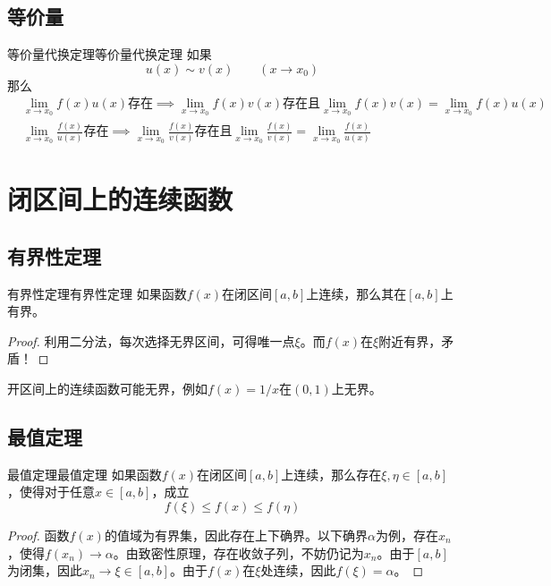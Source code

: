 \documentclass[lang = cn, scheme = chinese, thmcnt = section]{elegantbook}
\begin{document}
\subsection{等价量}

\begin{theorem}{等价量代换定理}{等价量代换定理}
	如果
	$$
	u(x)\sim v(x)\qquad (x\to x_0)
	$$
	那么
	\begin{align*}
		& \lim_{x\to x_0}f(x)u(x)\text{存在}\implies\lim_{x\to x_0}f(x)v(x)\text{存在且}\lim_{x\to x_0}f(x)v(x)=\lim_{x\to x_0}f(x)u(x)\\
		& \lim_{x\to x_0}\frac{f(x)}{u(x)}\text{存在}\implies\lim_{x\to x_0}\frac{f(x)}{v(x)}\text{存在且}\lim_{x\to x_0}\frac{f(x)}{v(x)}=\lim_{x\to x_0}\frac{f(x)}{u(x)}
	\end{align*}
\end{theorem}

\section{闭区间上的连续函数}

\subsection{有界性定理}

\begin{theorem}{有界性定理}{有界性定理}
	如果函数$f(x)$在闭区间$[a,b]$上连续，那么其在$[a,b]$上有界。
\end{theorem}

\begin{proof}
	利用二分法，每次选择无界区间，可得唯一点$\xi$。而$f(x)$在$\xi$附近有界，矛盾！
\end{proof}

\begin{note}
	开区间上的连续函数可能无界，例如$f(x)=1/x$在$(0,1)$上无界。
\end{note}

\subsection{最值定理}

\begin{theorem}{最值定理}{最值定理}
	如果函数$f(x)$在闭区间$[a,b]$上连续，那么存在$\xi,\eta\in [a,b]$，使得对于任意$x\in [a,b]$，成立
	$$
	f(\xi)\le f(x) \le f(\eta)
	$$
\end{theorem}

\begin{proof}
	函数$f(x)$的值域为有界集，因此存在上下确界。以下确界$\alpha$为例，存在$x_n$，使得$f(x_n)\to \alpha$。由致密性原理，存在收敛子列，不妨仍记为$x_n$。由于$[a,b]$为闭集，因此$x_n\to \xi\in [a,b]$。由于$f(x)$在$\xi$处连续，因此$f(\xi)=\alpha$。
\end{proof}
\end{document}
